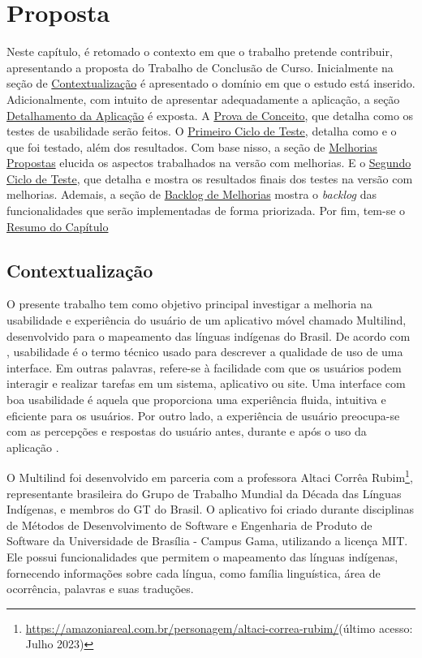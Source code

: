 \chapter[Proposta]{Proposta}
\label{chap:Proposta}
Neste capítulo, é retomado o contexto em que o trabalho pretende contribuir, apresentando a proposta do Trabalho de Conclusão de Curso. Inicialmente na seção de \hyperref[sec:Contextualização]{Contextualização} é 
apresentado o domínio em que o estudo está inserido. Adicionalmente, com intuito de apresentar adequadamente a aplicação, a seção \hyperref[sec:Detalhamento da Aplicacao]{Detalhamento da Aplicação} é exposta. A \hyperref[sec:Prova de Conceito]{Prova de Conceito}, 
que detalha como os testes de usabilidade serão feitos. O \hyperref[sec:Primeiro Ciclo]{Primeiro Ciclo de Teste}, detalha como e o que foi testado, além dos resultados. Com base nisso, a seção de \hyperref[sec:Melhorias Propostas]{Melhorias Propostas} elucida 
os aspectos trabalhados na versão com melhorias. E o \hyperref[sec:Segundo Ciclo]{Segundo Ciclo de Teste}, que detalha e mostra os resultados finais dos testes na versão com melhorias. Ademais, a seção de \hyperref[sec:Backlog]{Backlog de Melhorias} mostra o \textit{backlog}
das funcionalidades que serão implementadas de forma priorizada. Por fim, tem-se o \hyperref[sec:Resumo Proposta]{Resumo do Capítulo}

\section{Contextualização}
\label{sec:Contextualizacao}
O presente trabalho tem como objetivo principal investigar a melhoria na usabilidade e experiência do usuário de um aplicativo móvel chamado Multilind, desenvolvido para o mapeamento das línguas indígenas do Brasil. 
De acordo com , usabilidade é o termo técnico usado para descrever a qualidade de uso de uma interface. Em outras palavras, refere-se à facilidade com que os usuários podem interagir e realizar 
tarefas em um sistema, aplicativo ou site. Uma interface com boa usabilidade é aquela que proporciona uma experiência fluida, intuitiva e eficiente para os usuários. Por outro lado, a experiência de usuário preocupa-se 
com as percepções e respostas do usuário antes, durante e após o uso da aplicação \cite{iso9241210}.

O Multilind foi desenvolvido em parceria com a professora Altaci Corrêa Rubim\footnote{\url{https://amazoniareal.com.br/personagem/altaci-correa-rubim/}(último acesso: Julho 2023)}, representante brasileira do Grupo de Trabalho Mundial da Década das Línguas Indígenas, 
e membros do GT do Brasil. O aplicativo foi criado durante disciplinas de Métodos de Desenvolvimento de Software e Engenharia de Produto de Software da Universidade de Brasília - Campus Gama, utilizando a licença MIT. Ele possui funcionalidades que permitem o mapeamento 
das línguas indígenas, fornecendo informações sobre cada língua, como família linguística, área de ocorrência, palavras e suas traduções.


